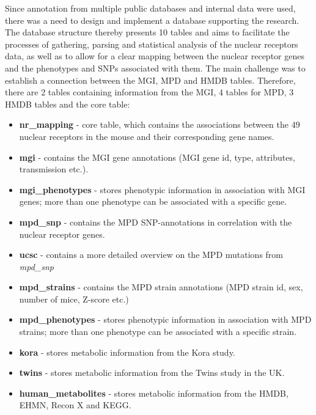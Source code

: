\documentclass[fleqn,11pt]{SelfArx}
\begin{document}
Since annotation from multiple public databases and internal data were used, there was a need to design and implement a database supporting the research. The database structure thereby presents 10 tables and aims to facilitate the processes of gathering, parsing and statistical analysis of the nuclear receptors data, as well as to allow for a clear mapping between the nuclear receptor genes and the phenotypes and SNPs associated with them. The main challenge was to establish a connection between the MGI, MPD and HMDB tables. Therefore, there are 2 tables containing information from the MGI, 4 tables for MPD, 3 HMDB tables and the core table:
\begin{itemize}
\item \textbf{nr\_mapping} - core table, which contains the associations between the 49 nuclear receptors in the mouse and their corresponding gene names. 
\item \textbf{mgi} - contains the MGI gene annotations (MGI gene id, type, attributes, transmission etc.). 
\item \textbf{mgi\_phenotypes} - stores phenotypic information in association with MGI genes; more than one phenotype can be associated with a specific gene.
\item \textbf{mpd\_snp} - contains the MPD SNP-annotations in correlation with the nuclear receptor genes. 
\item \textbf{ucsc} - contains a more detailed overview on the MPD mutations from \textit{mpd\_snp} 
\item \textbf{mpd\_strains} - contains the MPD strain annotations (MPD strain id, sex, number of mice, Z-score etc.)
\item \textbf{mpd\_phenotypes} - stores phenotypic information in association with MPD strains; more than one phenotype can be associated with a specific strain.
\item \textbf{kora} - stores metabolic information from the Kora study.
\item \textbf{twins} - stores metabolic information from the Twins study in the UK.
\item \textbf{human\_metabolites} - stores metabolic information from the HMDB, EHMN, Recon X and KEGG.  
\end{itemize} 
~~~~~~~\\  
\end{document}

